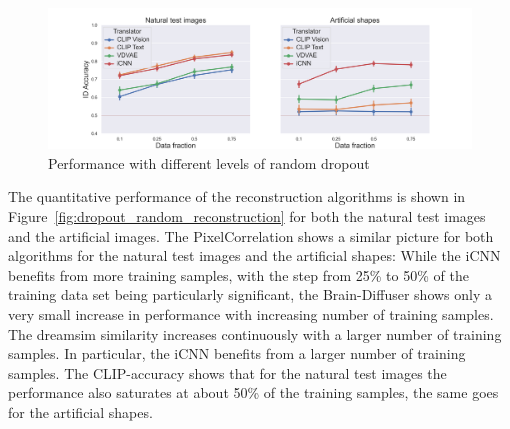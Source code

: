 \begin{figure}[ht]
  \centering
  \includegraphics[width=1\textwidth]{plots/dropout_random_translator.png}
  \caption[Translator Performance with increasing dropout]{ Performance with different levels of random dropout }\label{fig:dropout_random_translator}
\end{figure}

The quantitative performance of the reconstruction algorithms is shown in Figure~\ref{fig:dropout_random_reconstruction} for both the natural test images and the artificial images. The PixelCorrelation shows a similar picture for both algorithms for the natural test images and the artificial shapes: While the iCNN benefits from more training samples, with the step from 25\% to 50\% of the training data set being particularly significant, the Brain-Diffuser shows only a very small increase in performance with increasing number of training samples. The dreamsim similarity increases continuously with a larger number of training samples. In particular, the iCNN benefits from a larger number of training samples. The CLIP-accuracy shows that for the natural test images the performance also saturates at about 50\% of the training samples, the same goes for the artificial shapes.

